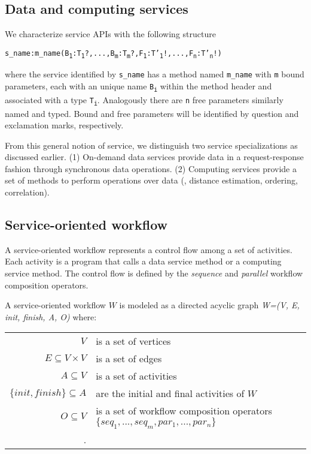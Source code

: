 \documentclass{acm_proc_article-sp}
\begin{document}
      
\subsection{Data and computing services}\label{sec:services}

We characterize service APIs with the following structure
			
{\texttt{s\_name:m\_name(B\textsubscript{1}:T\textsubscript{1}?,...,B\textsubscript{m}:T\textsubscript{m}?,F\textsubscript{1}:T'\textsubscript{1}!,...,F\textsubscript{n}:T'\textsubscript{n}!)}}

where the service identified by \texttt{s\_name} has a method named \texttt{m\_name} with \texttt{m} bound parameters, each with an unique name \texttt{B\textsubscript{i}} within the method header and associated with a type \texttt{T\textsubscript{i}}. Analogously there are \texttt{n} free parameters similarly named and typed. Bound and free parameters will be identified by question and exclamation marks, respectively.

From this general notion of service, we distinguish two service specializations as discussed earlier. (1) On-demand data services provide data in a request-response fashion through synchronous data operations. (2) Computing services provide a set of methods to perform operations over data (\eg{}, distance estimation, ordering, correlation).
            
\subsection{Service-oriented workflow} \label{sec:QWModel}
A service-oriented workflow represents a control flow among a set of activities. Each activity is a program that calls a data service method or a computing service method. The control flow is defined by the \textit{sequence} and \textit{parallel} workflow composition operators. 

A service-oriented workflow $W$ is modeled as a directed acyclic graph \textit{W=(V, E, init, finish, A, O)} where:
		\begin{center}
			\footnotesize
			\begin{tabular}{rp{5.5cm}}
				$V$                      & is a set of vertices \\
				$E \subseteq V \times V$ & is a set of edges \\
				$A \subseteq V$          & is a set of activities \\
				$\{init, finish\} \subseteq A$     & are the initial and final activities of $W$\\
				$O \subseteq V$          & is a set of workflow composition operators $\{seq_1,...,seq_m,par_1,...,par_n\}$\\.     
			\end{tabular}   
		\end{center}
               
\end{document}
